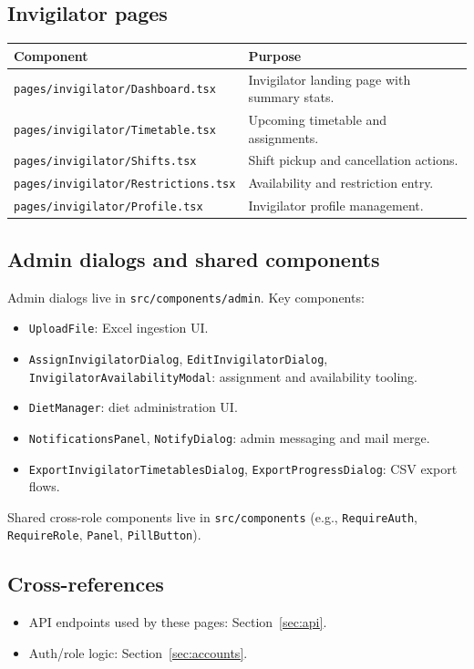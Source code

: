 \subsection{Invigilator pages}
\label{subsec:frontend:components:invpages}

\begin{longtable}{p{}p{}}
\toprule
\textbf{Component} & \textbf{Purpose} \\
\midrule
\texttt{pages/invigilator/Dashboard.tsx} & Invigilator landing page with summary stats. \\
\texttt{pages/invigilator/Timetable.tsx} & Upcoming timetable and assignments. \\
\texttt{pages/invigilator/Shifts.tsx} & Shift pickup and cancellation actions. \\
\texttt{pages/invigilator/Restrictions.tsx} & Availability and restriction entry. \\
\texttt{pages/invigilator/Profile.tsx} & Invigilator profile management. \\
\bottomrule
\end{longtable}

\subsection{Admin dialogs and shared components}
\label{subsec:frontend:components:admindialogs}

Admin dialogs live in \texttt{src/components/admin}. Key components:

\begin{itemize}
  \item \texttt{UploadFile}: Excel ingestion UI.
  \item \texttt{AssignInvigilatorDialog}, \texttt{EditInvigilatorDialog}, \texttt{InvigilatorAvailabilityModal}: assignment and availability tooling.
  \item \texttt{DietManager}: diet administration UI.
  \item \texttt{NotificationsPanel}, \texttt{NotifyDialog}: admin messaging and mail merge.
  \item \texttt{ExportInvigilatorTimetablesDialog}, \texttt{ExportProgressDialog}: CSV export flows.
\end{itemize}

Shared cross-role components live in \texttt{src/components} (e.g., \texttt{RequireAuth}, \texttt{RequireRole}, \texttt{Panel}, \texttt{PillButton}).

\subsection{Cross-references}
\label{subsec:frontend:components:links}

\begin{itemize}
  \item API endpoints used by these pages: Section~\ref{sec:api}.
  \item Auth/role logic: Section~\ref{sec:accounts}.
\end{itemize}
